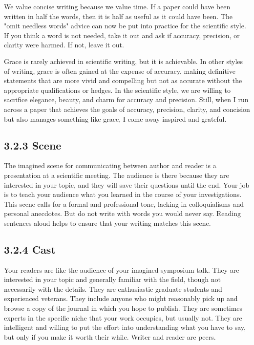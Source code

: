 We value concise writing because we value time. If a paper could have been written in half the words, then it is half as useful as it could have been. The "omit needless words" advice can now be put into practice for the scientific style. If you think a word is not needed, take it out and ask if accuracy, precision, or clarity were harmed. If not, leave it out.

Grace is rarely achieved in scientific writing, but it is achievable. In other styles of writing, grace is often gained at the expense of accuracy, making definitive statements that are more vivid and compelling but not as accurate without the appropriate qualifications or hedges. In the scientific style, we are willing to sacrifice elegance, beauty, and charm for accuracy and precision. Still, when I run across a paper that achieves the goals of accuracy, precision, clarity, and concision but also manages something like grace, I come away inspired and grateful.

\subsection*{3.2.3 Scene}
The imagined scene for communicating between author and reader is a presentation at a scientific meeting. The audience is there because they are interested in your topic, and they will save their questions until the end. Your job is to teach your audience what you learned in the course of your investigations. This scene calls for a formal and professional tone, lacking in colloquialisms and personal anecdotes. But do not write with words you would never say. Reading sentences aloud helps to ensure that your writing matches this scene.

\subsection*{3.2.4 Cast}
Your readers are like the audience of your imagined symposium talk. They are interested in your topic and generally familiar with the field, though not necessarily with the details. They are enthusiastic graduate students and experienced veterans. They include anyone who might reasonably pick up and browse a copy of the journal in which you hope to publish. They are sometimes experts in the specific niche that your work occupies, but usually not. They are intelligent and willing to put the effort into understanding what you have to say, but only if you make it worth their while. Writer and reader are peers.

